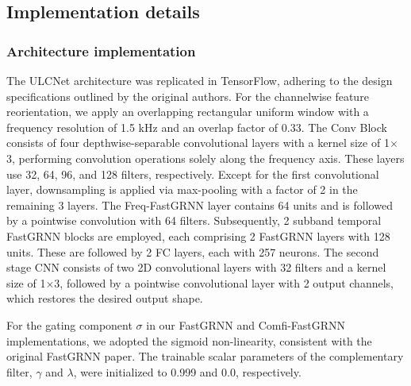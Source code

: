 \documentclass[9pt]{article}
\begin{document}
\subsection{Implementation details}
\label{ssec:implementation_details}

\subsubsection{Architecture implementation}
\label{sssec:architecture_implementation}

The ULCNet architecture was replicated in TensorFlow, adhering to the design specifications outlined by the original authors. For the channelwise feature reorientation, we apply an overlapping rectangular uniform window with a frequency resolution of 1.5 kHz and an overlap factor of 0.33. The Conv Block consists of four depthwise-separable convolutional layers with a kernel size of 1$\times$3, performing convolution operations solely along the frequency axis. These layers use 32, 64, 96, and 128 filters, respectively. Except for the first convolutional layer, downsampling is applied via max-pooling with a factor of 2 in the remaining 3 layers. The Freq-FastGRNN layer contains 64 units and is followed by a pointwise convolution with 64 filters. Subsequently, 2 subband temporal FastGRNN blocks are employed, each comprising 2 FastGRNN layers with 128 units. These are followed by 2 FC layers, each with 257 neurons. The second stage CNN consists of two 2D convolutional layers with 32 filters and a kernel size of 1$\times$3, followed by a pointwise convolutional layer with 2 output channels, which restores the desired output shape.


For the gating component $\sigma$ in our FastGRNN and Comfi-FastGRNN implementations, we adopted the sigmoid non-linearity, consistent with the original FastGRNN paper. The trainable scalar parameters of the complementary filter, $\gamma$ and $\lambda$, were initialized to 0.999 and 0.0, respectively.
\end{document}
